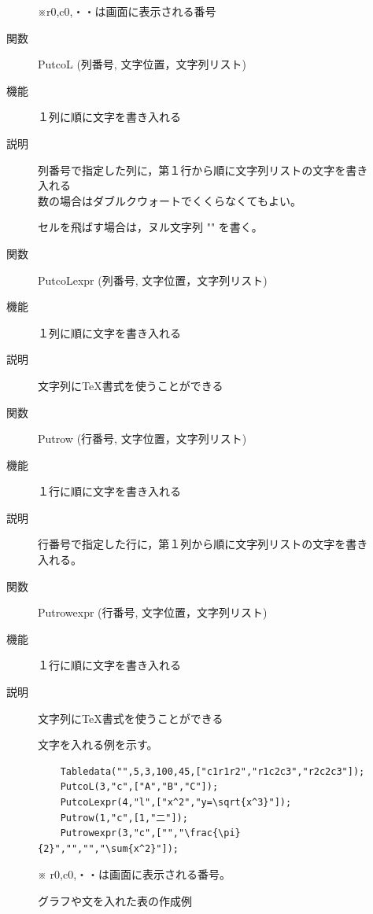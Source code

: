 \documentclass[papersize,a4paper,12pt,uplatex]{jsarticle}
\begin{document}
\begin{description}
\begin{description}
  ※r0,c0,・・は画面に表示される番号

\vspace{\baselineskip}
\hypertarget{putcol}{}
\item[関数]  PutcoL (列番号, 文字位置，文字列リスト)
\item[機能]  １列に順に文字を書き入れる
\item[説明]  列番号で指定した列に，第１行から順に文字列リストの文字を書き入れる\\
  数の場合はダブルクウォートでくくらなくてもよい。
  
  セルを飛ばす場合は，ヌル文字列 "" を書く。
  
\vspace{\baselineskip}
\hypertarget{putcolexpr}{}
\item[関数]  PutcoLexpr (列番号, 文字位置，文字列リスト)
\item[機能]  １列に順に文字を書き入れる
\item[説明]  文字列に\TeX 書式を使うことができる

\vspace{\baselineskip}
\hypertarget{putrow}{}
\item[関数]  Putrow (行番号, 文字位置，文字列リスト)
\item[機能]  １行に順に文字を書き入れる
\item[説明]  行番号で指定した行に，第１列から順に文字列リストの文字を書き入れる。


\vspace{\baselineskip}
\hypertarget{putrowexpr}{}
\item[関数]  Putrowexpr (行番号, 文字位置，文字列リスト)
\item[機能]  １行に順に文字を書き入れる
\item[説明]  文字列に\TeX 書式を使うことができる

文字を入れる例を示す。
\begin{verbatim}
    Tabledata("",5,3,100,45,["c1r1r2","r1c2c3","r2c2c3"]);
    PutcoL(3,"c",["A","B","C"]);
    PutcoLexpr(4,"l",["x^2","y=\sqrt{x^3}"]);
    Putrow(1,"c",[1,"二"]);
    Putrowexpr(3,"c",["","\frac{\pi}{2}","","","\sum{x^2}"]);
\end{verbatim}
 \vspace{\baselineskip}
          \begin{center}  \end{center}

  ※ r0,c0,・・は画面に表示される番号。

グラフや文を入れた表の作成例


\end{description}
\end{description}
\end{document}
